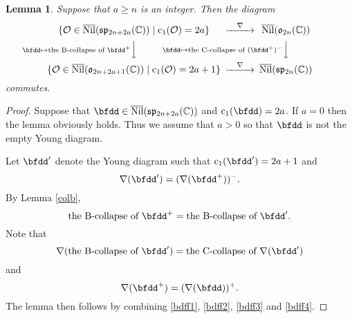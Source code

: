 \documentclass[12pt,a4paper]{amsart}
\newcommand{\BC}{{\mathbb {C}}}
\newcommand{\CO}{{\mathcal {O}}}
\newcommand{\p}{\mathfrak p}
\newcommand{\s}{\mathfrak s}
\renewcommand{\o}{\mathfrak o}
\newcommand{\be}{\begin {equation}}
\newcommand{\ee}{\end {equation}}
\numberwithin{equation}{section}
\newtheorem{lem}[thm]{Lemma}
\theoremstyle{remark}
\begin{document}
\begin{lem}\label{spspo00}
Suppose that $a\geq n$ is an integer. Then the diagram
\be\label{cdls22}
 \begin{CD}
                          \{\CO\in \overline{\mathrm{Nil}}(\s\p_{2n+2a}(\BC))\mid \mathrm{c}_1( \CO)=2a\}
             @> \nabla   >>  \overline{\mathrm{Nil}}(\o_{2n}(\BC))\\
            @V \bfdd\mapsto \textrm{the B-collapse of  $\bfdd^+$} VV           @V\bfdd\mapsto \textrm{the C-collapse of  $(\bfdd^+)^-$}V V\\
 \{\CO\in \overline{\mathrm{Nil}}(\o_{2n+2a+1}(\BC))\mid \mathrm{c}_1(\CO)=2a+1\} @>  \nabla  >> \overline{\mathrm{Nil}}(\s\p_{2n}(\BC)) \\
  \end{CD}
\ee
commutes.%

\end{lem}
\begin{proof}


Suppose that $\bfdd\in \overline{\mathrm{Nil}}(\s\p_{2n+2a}(\BC))$ and $\mathrm c_1(\bfdd)=2a$. If $a=0$ then the lemma obviously holds. Thus we assume that $a>0$ so that $\bfdd$ is not the empty Young diagram.

Let $\bfdd'$ denote the Young diagram such that  $\mathrm{c}_1(\bfdd')=2a+1$ and
\be\label{bdff1}
\nabla(\bfdd')=(\nabla(\bfdd^+))^-.
\ee
 By  Lemma \ref{colb},
\be\label{bdff2}
  \textrm{the B-collapse of  $\bfdd^+$}= \textrm{the B-collapse of  $\bfdd'$}.
\ee
Note that
\be\label{bdff3}
  \nabla(\textrm{the B-collapse of  $\bfdd'$})=\textrm{the C-collapse of  $\nabla(\bfdd')$}
\ee
and
\be\label{bdff4}
  \nabla(\bfdd^+)=(\nabla(\bfdd))^+.
\ee
The lemma then follows by combining \eqref{bdff1}, \eqref{bdff2}, \eqref{bdff3} and \eqref{bdff4}.
\end{proof}
\end{document}
